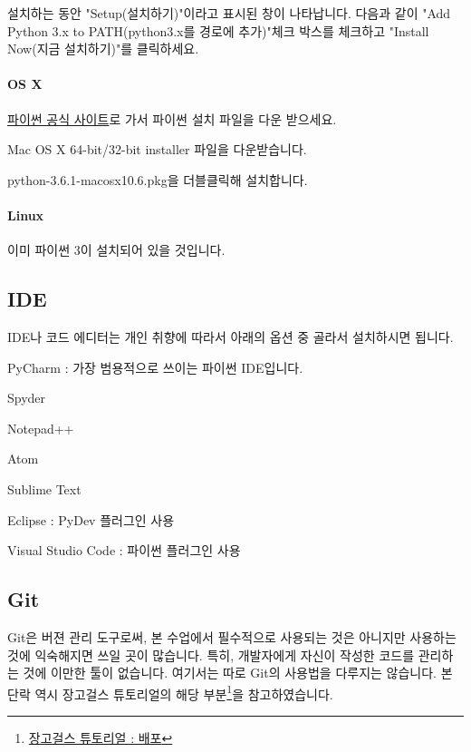 \documentclass[titlepage]{report}
\begin{document}
설치하는 동안 "Setup(설치하기)"이라고 표시된 창이 나타납니다. 다음과 같이 "Add Python 3.x to PATH(python3.x를 경로에 추가)"체크 박스를 체크하고 "Install Now(지금 설치하기)"를 클릭하세요.

\paragraph{OS X} 

\href{https://www.python.org/downloads/}{파이썬 공식 사이트}로 가서 파이썬 설치 파일을 다운 받으세요. 

\begin{compactitem}
\item Mac OS X 64-bit/32-bit installer 파일을 다운받습니다.
\item python-3.6.1-macosx10.6.pkg을 더블클릭해 설치합니다.
\end{compactitem}

\paragraph{Linux} 

이미 파이썬 3이 설치되어 있을 것입니다. 

\subsection{IDE}

IDE나 코드 에디터는 개인 취향에 따라서 아래의 옵션 중 골라서 설치하시면 됩니다. 

\begin{compactitem} 
\item PyCharm : 가장 범용적으로 쓰이는 파이썬 IDE입니다. 
\item Spyder 
\item Notepad++ 
\item Atom 
\item Sublime Text 
\item Eclipse : PyDev 플러그인 사용 
\item Visual Studio Code : 파이썬 플러그인 사용
\end{compactitem} 

\subsection{Git}

Git은 버젼 관리 도구로써, 본 수업에서 필수적으로 사용되는 것은 아니지만 사용하는 것에 익숙해지면 쓰일 곳이 많습니다. 특히, 개발자에게 자신이 작성한 코드를 관리하는 것에 이만한 툴이 없습니다. 여기서는 따로 Git의 사용법을 다루지는 않습니다. 본 단락 역시 장고걸스 튜토리얼의 해당 부분\footnote{\href{https://tutorial.djangogirls.org/ko/deploy/}{장고걸스 튜토리얼 : 배포}}을 참고하였습니다. 
\end{document}
